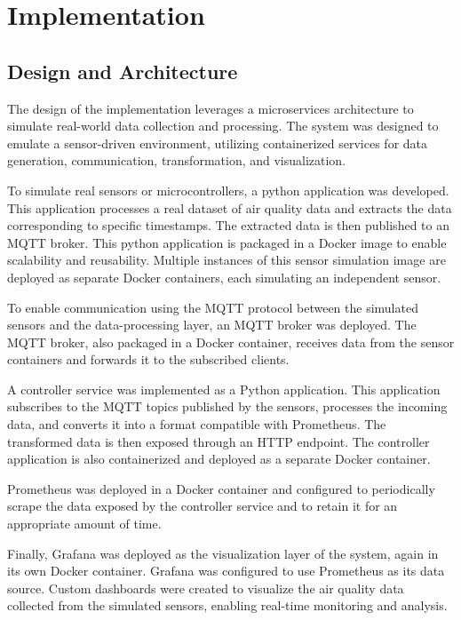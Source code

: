 \chapter{Implementation} \label{ch:implementation}

\section{Design and Architecture}
The design of the implementation leverages a microservices architecture to simulate real-world data collection and processing. The system was designed to emulate a sensor-driven environment, utilizing containerized services for data generation, communication, transformation, and visualization.

To simulate real sensors or microcontrollers, a python application was developed. This application processes a real dataset of air quality data and extracts the data corresponding to specific timestamps. The extracted data is then published to an MQTT broker. This python application is packaged in a Docker image to enable scalability and reusability. Multiple instances of this sensor simulation image are deployed as separate Docker containers, each simulating an independent sensor.

To enable communication using the MQTT protocol between the simulated sensors and the data-processing layer, an MQTT broker was deployed. The MQTT broker, also packaged in a Docker container, receives data from the sensor containers and forwards it to the subscribed clients.

A controller service was implemented as a Python application. This application subscribes to the MQTT topics published by the sensors, processes the incoming data, and converts it into a format compatible with Prometheus. The transformed data is then exposed through an HTTP endpoint. The controller application is also containerized and deployed as a separate Docker container.

Prometheus was deployed in a Docker container and configured to periodically scrape the data exposed by the controller service and to retain it for an appropriate amount of time.

Finally, Grafana was deployed as the visualization layer of the system, again in its own Docker container. Grafana was configured to use Prometheus as its data source. Custom dashboards were created to visualize the air quality data collected from the simulated sensors, enabling real-time monitoring and analysis.


